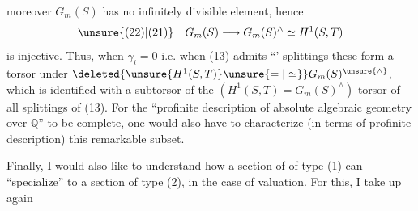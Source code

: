 moreover $G_m(S)$ has no infinitely divisible element, hence
\[
\unsure{(22)|(21)}\quad G_m(S)\longrightarrow G_m(S)^\wedge\simeq H^1(S,T)
\]
is injective. Thus, when $\gamma_i=0$ i.e. when (13) admits ``' splittings  these form a torsor under $\deleted{\unsure{H^1(S,T)}\unsure{=|\simeq}}G_m(S)^{\unsure{\wedge}}$, which is identified with a subtorsor of the $(H^1(S,T)=G_m(S)^\wedge)$-torsor of all splittings of (13). For the ``profinite description of absolute algebraic geometry over $\mathbb Q$'' to be complete, one would also have to characterize (in terms of  profinite description) this remarkable subset.

Finally, I would also like to understand how a section of  of type (1) can ``specialize'' to a section of type (2), in the case of  valuation. For this, I take up again
